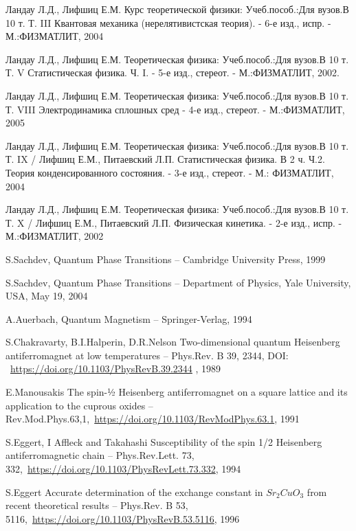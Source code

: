 \documentclass[11pt]{article}
\begin{document}
\begin{thebibliography}{3}
Ландау Л.Д., Лифшиц Е.М. Курс теоретической физики: Учеб.пособ.:Для вузов.В 10 т. Т. III Квантовая механика (нерелятивистская теория). - 6-е изд., испр. - М.:ФИЗМАТЛИТ, 2004

Ландау Л.Д., Лифшиц Е.М. Теоретическая физика: Учеб.пособ.:Для вузов.В 10 т. Т. V Статистическая физика. Ч. I. - 5-е изд., стереот. - М.:ФИЗМАТЛИТ, 2002.


Ландау Л.Д., Лифшиц Е.М. Теоретическая физика: Учеб.пособ.:Для вузов.В 10 т. Т. VIII Электродинамика сплошных сред - 4-е изд., стереот. - М.:ФИЗМАТЛИТ, 2005

Ландау Л.Д., Лифшиц Е.М. Теоретическая физика: Учеб.пособ.:Для вузов.В 10 т. Т. IX / Лифшиц Е.М., Питаевский Л.П. Статистическая физика. В 2 ч. Ч.2. Теория конденсированного состояния. - 3-е изд., стереот. - М.: ФИЗМАТЛИТ, 2004

Ландау Л.Д., Лифшиц Е.М. Теоретическая физика: Учеб.пособ.:Для вузов.В 10 т. Т. X / Лифшиц Е.М., Питаевский Л.П. Физическая кинетика. - 2-е изд., испр. - М.:ФИЗМАТЛИТ, 2002


S.Sachdev, Quantum Phase Transitions -- Cambridge University Press, 1999

S.Sachdev, Quantum Phase Transitions -- Department of Physics, Yale University, USA, May 19, 2004

A.Auerbach, Quantum Magnetism -- Springer-Verlag, 1994

S.Chakravarty, B.I.Halperin, D.R.Nelson Two-dimensional quantum Heisenberg antiferromagnet at low temperatures -- Phys.Rev. B 39, 2344, DOI: ~\url{https://doi.org/10.1103/PhysRevB.39.2344} , 1989

E.Manousakis The spin-½ Heisenberg antiferromagnet on a square lattice and its application to the cuprous oxides -- Rev.Mod.Phys.63,1,~\url{https://doi.org/10.1103/RevModPhys.63.1}, 1991

S.Eggert, I Affleck and Takahashi Susceptibility of the spin 1/2 Heisenberg antiferromagnetic chain -- Phys.Rev.Lett. 73, 332,~\url{https://doi.org/10.1103/PhysRevLett.73.332}, 1994 

S.Eggert Accurate determination of the exchange constant in $Sr_2CuO_3$ from recent theoretical results -- Phys.Rev. B 53, 5116,~\url{https://doi.org/10.1103/PhysRevB.53.5116}, 1996


\end{thebibliography}
\end{document}
